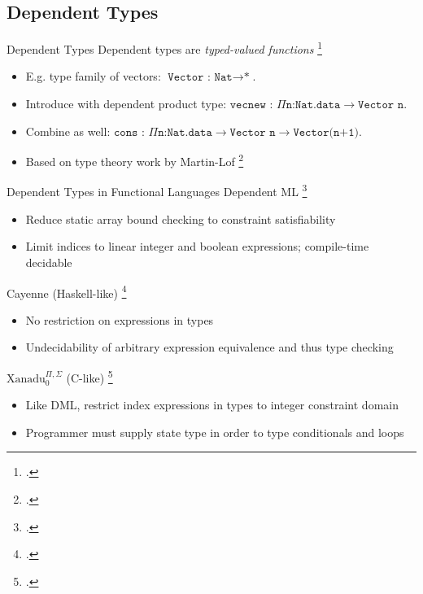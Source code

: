 \documentclass[aspectratio=169]{beamer}
\begin{document}
\subsection{Dependent Types}

\begin{frame}{Dependent Types}
    Dependent types are \emph{typed-valued functions} \footcite{pierce_advanced_2005}
    \begin{itemize}
        \item E.g. type family of vectors: $\texttt{Vector : Nat}\rightarrow\texttt{*}$.
        \item Introduce with \alert{dependent product type}: $\texttt{vecnew : }\Pi\texttt{n:Nat.data}\rightarrow\texttt{Vector n}$.
        \item Combine as well: $\texttt{cons : }\Pi\texttt{n:Nat.data}\rightarrow\texttt{Vector n}\rightarrow\texttt{Vector(n+1)}$.
        \item Based on type theory work by Martin-L\:of \footcite{martin-lof_constructive_1984}
    \end{itemize}
\end{frame}

\begin{frame}{Dependent Types in Functional Languages}
\vspace{-0.08in}
Dependent ML \footcite{xi_eliminating_1998}
\begin{itemize}
    \item Reduce static array bound checking to constraint satisfiability
    \item Limit indices to linear integer and boolean expressions; compile-time decidable
\end{itemize}
Cayenne (Haskell-like) \footcite{augustsson_cayennelanguage_1998}
\begin{itemize}
    \item No restriction on expressions in types
    \item Undecidability of arbitrary expression equivalence and thus type checking
\end{itemize}
$\text{Xanadu}_{0}^{\Pi,\Sigma}$ (C-like) \footcite{xi_imperative_2000}
\begin{itemize}
    \item Like DML, restrict index expressions in types to integer constraint domain
    \item Programmer must supply state type in order to type conditionals and loops
\end{itemize}
    \vspace{0.2in}
\end{frame}
\end{document}
